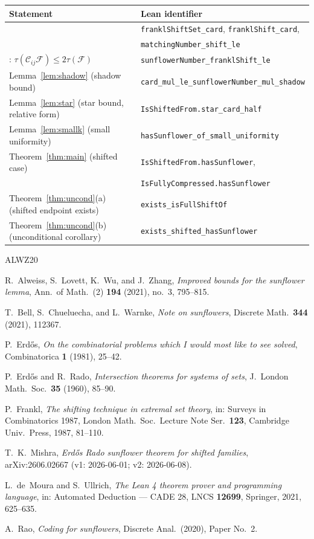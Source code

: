 \documentclass[11pt,a4paper]{article}
\theoremstyle{remark}
\newcommand{\cC}{\mathcal{C}}
\newcommand{\cF}{\mathcal{F}}
\begin{document}
\begin{center}
\begin{tabular}{ll}
\hline
Statement & Lean identifier \\
\hline
\cite[Lemma~1(i),(ii),(iii)]{Mi26} &
  \texttt{franklShiftSet\_card}, \texttt{franklShift\_card},\\
  & \texttt{matchingNumber\_shift\_le} \\
\cite[Lemma~2]{Mi26}: $\tau(\cC_{ij}\cF)\le2\tau(\cF)$ &
  \texttt{sunflowerNumber\_franklShift\_le} \\
Lemma~\ref{lem:shadow} (shadow bound) &
  \texttt{card\_mul\_le\_sunflowerNumber\_mul\_shadow} \\
Lemma~\ref{lem:star} (star bound, relative form) &
  \texttt{IsShiftedFrom.star\_card\_half} \\
Lemma~\ref{lem:smallk} (small uniformity) &
  \texttt{hasSunflower\_of\_small\_uniformity} \\
Theorem~\ref{thm:main} (shifted case) &
  \texttt{IsShiftedFrom.hasSunflower},\\
  & \texttt{IsFullyCompressed.hasSunflower} \\
Theorem~\ref{thm:uncond}(a) (shifted endpoint exists) &
  \texttt{exists\_isFullShiftOf} \\
Theorem~\ref{thm:uncond}(b) (unconditional corollary) &
  \texttt{exists\_shifted\_hasSunflower} \\
\hline
\end{tabular}
\end{center}

\begin{thebibliography}{ALWZ20}

R.~Alweiss, S.~Lovett, K.~Wu, and J.~Zhang,
\emph{Improved bounds for the sunflower lemma},
Ann.\ of Math.\ (2) \textbf{194} (2021), no.~3, 795--815.

T.~Bell, S.~Chueluecha, and L.~Warnke,
\emph{Note on sunflowers},
Discrete Math.\ \textbf{344} (2021), 112367.

P.~Erd\H{o}s,
\emph{On the combinatorial problems which I would most like to see
solved},
Combinatorica \textbf{1} (1981), 25--42.

P.~Erd\H{o}s and R.~Rado,
\emph{Intersection theorems for systems of sets},
J.\ London Math.\ Soc.\ \textbf{35} (1960), 85--90.

P.~Frankl,
\emph{The shifting technique in extremal set theory},
in: Surveys in Combinatorics 1987, London Math.\ Soc.\ Lecture Note
Ser.\ \textbf{123}, Cambridge Univ.\ Press, 1987, 81--110.

T.~K.~Mishra,
\emph{Erd\H{o}s Rado sunflower theorem for shifted families},
arXiv:2606.02667 (v1: 2026-06-01; v2: 2026-06-08).

L.~de~Moura and S.~Ullrich,
\emph{The Lean 4 theorem prover and programming language},
in: Automated Deduction --- CADE 28, LNCS \textbf{12699}, Springer,
2021, 625--635.

A.~Rao,
\emph{Coding for sunflowers},
Discrete Anal.\ (2020), Paper No.~2.

\end{thebibliography}
\end{document}

